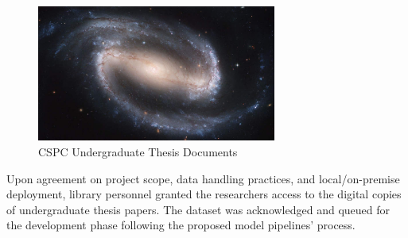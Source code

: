 \begin{refsection}
\begin{figure}[h]
    \centering
    \includegraphics[width=0.7\textwidth]{figures/sampleFig1.jpg}
    \caption{CSPC Undergraduate Thesis Documents}
\end{figure}
Upon agreement on project scope, data handling practices, and local/on-premise deployment, library personnel granted the researchers access to the digital copies of undergraduate thesis papers. The dataset was acknowledged and queued for the development phase following the proposed model pipelines’ process.

\end{refsection}

